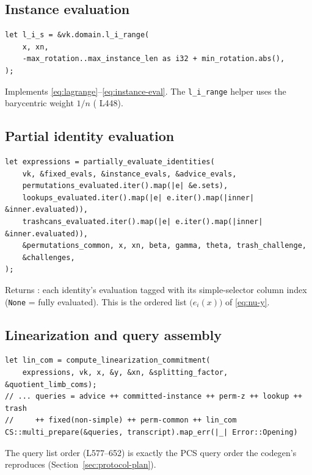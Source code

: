 \subsection{Instance evaluation}
\begin{lstlisting}[style=rust]
let l_i_s = &vk.domain.l_i_range(
    x, xn,
    -max_rotation..max_instance_len as i32 + min_rotation.abs(),
);
\end{lstlisting}
Implements \eqref{eq:lagrange}--\eqref{eq:instance-eval}. The
\texttt{l\_\allowbreak{}i\_\allowbreak{}range} helper uses the barycentric weight $1/n$
( L448).

\subsection{Partial identity evaluation}
\begin{lstlisting}[style=rust]
let expressions = partially_evaluate_identities(
    vk, &fixed_evals, &instance_evals, &advice_evals,
    permutations_evaluated.iter().map(|e| &e.sets),
    lookups_evaluated.iter().map(|e| e.iter().map(|inner| &inner.evaluated)),
    trashcans_evaluated.iter().map(|e| e.iter().map(|inner| &inner.evaluated)),
    &permutations_common, x, xn, beta, gamma, theta, trash_challenge,
    &challenges,
);
\end{lstlisting}
Returns : each identity's evaluation tagged
with its simple-selector column index (\texttt{None} = fully evaluated).
This is the ordered list $\bigl(e_i(x)\bigr)$ of \eqref{eq:nu-y}.

\subsection{Linearization and query assembly}
\begin{lstlisting}[style=rust]
let lin_com = compute_linearization_commitment(
    expressions, vk, x, &y, &xn, &splitting_factor, &quotient_limb_coms);
// ... queries = advice ++ committed-instance ++ perm-z ++ lookup ++ trash
//     ++ fixed(non-simple) ++ perm-common ++ lin_com
CS::multi_prepare(&queries, transcript).map_err(|_| Error::Opening)
\end{lstlisting}
The query list order (L577--652) is exactly the PCS query order the
codegen's  reproduces (Section~\ref{sec:protocol-plan}).

\section{}
\label{sec:partial-eval}

